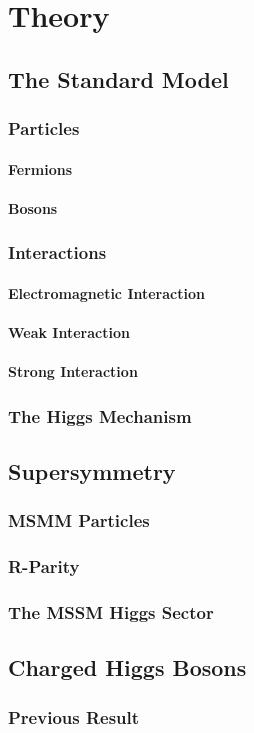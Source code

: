 \chapter{Theory}
    

\section{The Standard Model}

	\subsection{Particles}        

		\subsubsection{Fermions}

		\subsubsection{Bosons}

	\subsection{Interactions}

		\subsubsection{Electromagnetic Interaction}

		\subsubsection{Weak Interaction}

		\subsubsection{Strong Interaction}

	\subsection{The Higgs Mechanism}


\section{Supersymmetry}

	\subsection{MSMM Particles}

	\subsection{R-Parity}

	\subsection{The MSSM Higgs Sector}

\section{Charged Higgs Bosons}

	\subsection{Previous Result}